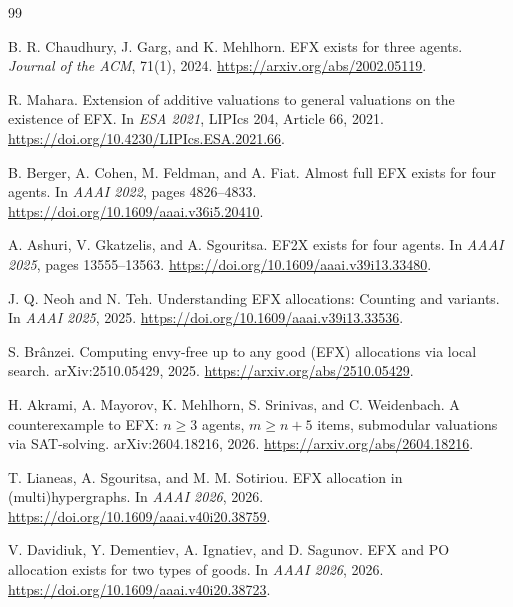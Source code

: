 \documentclass[11pt]{article}
\theoremstyle{definition}
\begin{document}
\begin{thebibliography}{99}

B. R. Chaudhury, J. Garg, and K. Mehlhorn.
\newblock EFX exists for three agents.
\newblock \emph{Journal of the ACM}, 71(1), 2024.
\newblock \url{https://arxiv.org/abs/2002.05119}.

R. Mahara.
\newblock Extension of additive valuations to general valuations on the
existence of EFX.
\newblock In \emph{ESA 2021}, LIPIcs 204, Article 66, 2021.
\newblock \url{https://doi.org/10.4230/LIPIcs.ESA.2021.66}.

B. Berger, A. Cohen, M. Feldman, and A. Fiat.
\newblock Almost full EFX exists for four agents.
\newblock In \emph{AAAI 2022}, pages 4826--4833.
\newblock \url{https://doi.org/10.1609/aaai.v36i5.20410}.

A. Ashuri, V. Gkatzelis, and A. Sgouritsa.
\newblock EF2X exists for four agents.
\newblock In \emph{AAAI 2025}, pages 13555--13563.
\newblock \url{https://doi.org/10.1609/aaai.v39i13.33480}.

J. Q. Neoh and N. Teh.
\newblock Understanding EFX allocations: Counting and variants.
\newblock In \emph{AAAI 2025}, 2025.
\newblock \url{https://doi.org/10.1609/aaai.v39i13.33536}.

S. Br\^anzei.
\newblock Computing envy-free up to any good (EFX) allocations via local
search.
\newblock arXiv:2510.05429, 2025.
\newblock \url{https://arxiv.org/abs/2510.05429}.

H. Akrami, A. Mayorov, K. Mehlhorn, S. Srinivas, and C. Weidenbach.
\newblock A counterexample to EFX: $n\ge3$ agents, $m\ge n+5$ items,
submodular valuations via SAT-solving.
\newblock arXiv:2604.18216, 2026.
\newblock \url{https://arxiv.org/abs/2604.18216}.

T. Lianeas, A. Sgouritsa, and M. M. Sotiriou.
\newblock EFX allocation in (multi)hypergraphs.
\newblock In \emph{AAAI 2026}, 2026.
\newblock \url{https://doi.org/10.1609/aaai.v40i20.38759}.

V. Davidiuk, Y. Dementiev, A. Ignatiev, and D. Sagunov.
\newblock EFX and PO allocation exists for two types of goods.
\newblock In \emph{AAAI 2026}, 2026.
\newblock \url{https://doi.org/10.1609/aaai.v40i20.38723}.

\end{thebibliography}
\end{document}
